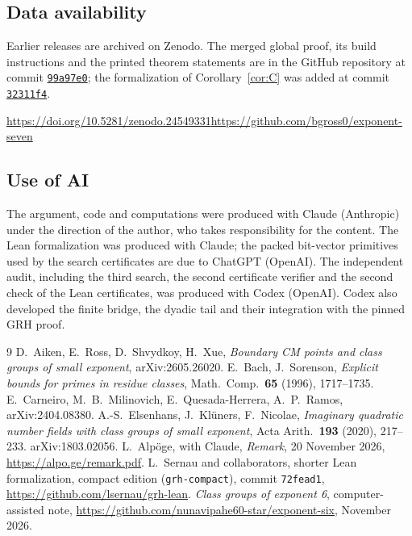\documentclass[11pt]{amsart}
\theoremstyle{remark}
\begin{document}
\subsection*{Data availability}
Earlier releases are archived on Zenodo. The merged global proof, its build instructions and the printed theorem statements are in the GitHub repository at commit \href{https://github.com/bgross0/exponent-seven/tree/99a97e077b9ddb2430d5da862a1d0842854330f1}{\texttt{99a97e0}}; the formalization of Corollary~\ref{cor:C} was added at commit \href{https://github.com/bgross0/exponent-seven/tree/32311f41fc397b2f45e09757559970ddea3e8475}{\texttt{32311f4}}.
\begin{center}
\url{https://doi.org/10.5281/zenodo.24549331}\qquad \url{https://github.com/bgross0/exponent-seven}
\end{center}

\subsection*{Use of AI}
The argument, code and computations were produced with Claude (Anthropic) under the direction of the author, who takes responsibility for the content. The Lean formalization was produced with Claude; the packed bit-vector primitives used by the search certificates are due to ChatGPT (OpenAI). The independent audit, including the third search, the second certificate verifier and the second check of the Lean certificates, was produced with Codex (OpenAI). Codex also developed the finite bridge, the dyadic tail and their integration with the pinned GRH proof.

\begin{thebibliography}{9}
 D.~Aiken, E.~Ross, D.~Shvydkoy, H.~Xue, \emph{Boundary CM points and class groups of small exponent}, arXiv:2605.26020.
 E.~Bach, J.~Sorenson, \emph{Explicit bounds for primes in residue classes}, Math.\ Comp.\ \textbf{65} (1996), 1717--1735.
 E.~Carneiro, M.~B.~Milinovich, E.~Quesada-Herrera, A.~P.~Ramos, arXiv:2404.08380.
 A.-S.~Elsenhans, J.~Kl\"uners, F.~Nicolae, \emph{Imaginary quadratic number fields with class groups of small exponent}, Acta Arith.\ \textbf{193} (2020), 217--233. arXiv:1803.02056.
 L.~Alp\"oge, with Claude, \emph{Remark}, 20 November 2026, \url{https://alpo.ge/remark.pdf}. L.~Sernau and collaborators, shorter Lean formalization, compact edition (\texttt{grh-compact}), commit \texttt{72fead1}, \url{https://github.com/lsernau/grh-lean}.
 \emph{Class groups of exponent 6}, computer-assisted note, \url{https://github.com/nunavipahe60-star/exponent-six}, November 2026.
\end{thebibliography}
\end{document}
